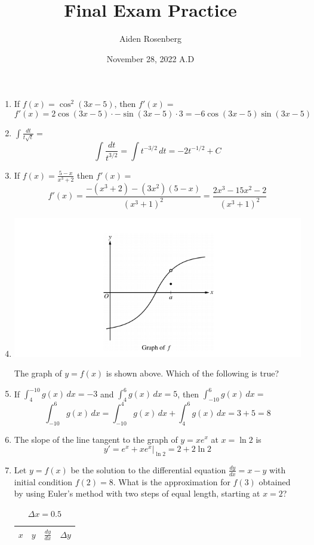 \documentclass[12pt]{article}
\title{Final Exam Practice}
\author{Aiden Rosenberg}
\date{November 28, 2022 A.D}
\begin{document}
\maketitle
\begin{enumerate}
    \item If $f(x)=\cos^2(3x-5)$, then $f'(x)=$
    $$f'(x)=2\cos(3x-5)\cdot -\sin (3x-5) \cdot 3 = \boxed{-6\cos(3x-5)\sin(3x-5)}$$
    \item $\int\frac{dt}{t\sqrt{t}} = $
    $$\int \frac{dt}{t^{3/2}} = \int t^{-3/2}\,dt = \boxed{-2t^{-1/2}+C}$$
    \item If $f(x)=\frac{5-x}{x^3+2}$ then $f'(x)=$
    $$f'(x)=\frac{-(x^3+2)-(3x^2)(5-x)}{(x^3+1)^2}=\boxed{\frac{2x^3-15x^2-2}{(x^3+1)^2}}$$
    \item 
    \begin{center}
        \includegraphics[width=6in]{FEP1.png}
    \end{center}
    The graph of $y = f(x)$ is shown above. Which of the following is true?
    \item If $\int_{4}^{-10} g(x) \, dx = -3$ and $\int_{4}^{6} g(x) \, dx = 5$, then $\int_{-10}^{6} g(x)\, dx = $
    $$\int_{-10}^{6} g(x) \, dx = \int_{-10}^{4} g(x)\, dx + \int_{4}^{6} g(x)\, dx = 3 + 5 = \boxed{8}$$
    \item The slope of the line tangent to the graph of $y=xe^x$ at $x = \ln 2$ is
    $$y'= e^x+xe^x \biggr\rvert_{\ln 2} = \boxed{2+2\ln 2}$$
    \item Let $y = f(x)$ be the solution to the differential equation $\frac{dy}{dx}=x-y$ with initial condition $f(2) = 8$. What is the approximation for $f(3)$ obtained by using Euler's method with two steps of equal length, starting at $x = 2$?
    \begin{table}[h]
        \centering
        \caption{$\Delta x = 0.5$}
        \begin{tabular}{l|l|l|l}
        $x$ & \multicolumn{1}{l|}{$y$} & \multicolumn{1}{l|}{$\frac{dy}{dx}$} & $\Delta y$ \\ \hline

\end{tabular}
\end{table}
\end{enumerate}
\end{document}
